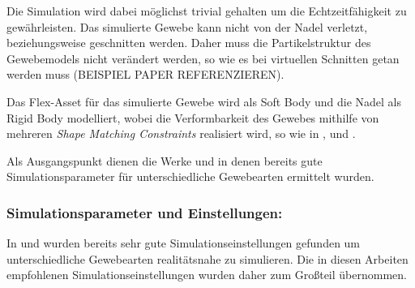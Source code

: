 Die Simulation wird dabei möglichst trivial gehalten um die Echtzeitfähigkeit zu gewährleisten. Das simulierte Gewebe kann nicht von der Nadel verletzt, beziehungsweise geschnitten werden. Daher muss die Partikelstruktur des Gewebemodels nicht verändert werden, so wie es bei virtuellen Schnitten getan werden muss (BEISPIEL PAPER REFERENZIEREN).

Das Flex-Asset für das simulierte Gewebe wird als Soft Body und die Nadel als Rigid Body modelliert, wobei die Verformbarkeit des Gewebes mithilfe von mehreren \textit{Shape Matching Constraints} realisiert wird, so wie in \cite{UPP}, \cite{BreastBiopsy} und \cite{PBDKidney}. 

Als Ausgangspunkt dienen die Werke \cite{PBDKidney} und \cite{BreastBiopsy} in denen bereits gute Simulationsparameter für unterschiedliche Gewebearten ermittelt wurden.

\subsubsection{Simulationsparameter und Einstellungen: }    

In \cite{PBDKidney} und \cite{BreastBiopsy} wurden bereits sehr gute Simulationseinstellungen gefunden um unterschiedliche Gewebearten realitätsnahe zu simulieren. Die in diesen Arbeiten empfohlenen Simulationseinstellungen wurden daher zum Großteil übernommen.

